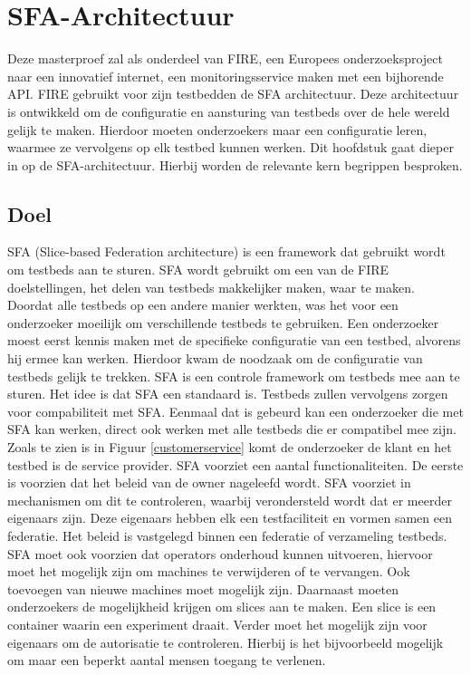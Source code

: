 \chapter{SFA-Architectuur}

{\samenvatting Deze masterproef zal als onderdeel van FIRE, een Europees onderzoeksproject naar een innovatief internet, een monitoringsservice maken met een bijhorende API. FIRE gebruikt voor zijn testbedden de SFA architectuur. Deze architectuur is ontwikkeld om de configuratie en aansturing van testbeds over de hele wereld gelijk te maken. Hierdoor moeten onderzoekers maar een configuratie leren, waarmee ze vervolgens op elk testbed kunnen werken. Dit hoofdstuk gaat dieper in op de SFA-architectuur. Hierbij worden de relevante kern begrippen besproken.}

\section{Doel}
\npar
SFA (Slice-based Federation architecture) is een framework dat gebruikt wordt om testbeds aan te sturen\citep{SFA-overview}. SFA wordt gebruikt om een van de FIRE doelstellingen, het delen van testbeds makkelijker maken, waar te maken. Doordat alle testbeds op een andere manier werkten, was het voor een onderzoeker moeilijk om verschillende testbeds te gebruiken. Een onderzoeker moest eerst kennis maken met de specifieke configuratie van een testbed, alvorens hij ermee kan werken. Hierdoor kwam de noodzaak om de configuratie van testbeds gelijk te trekken.
\clearpage
\npar
SFA is een controle framework om testbeds mee aan te sturen. Het idee is dat SFA een standaard is. Testbeds zullen vervolgens zorgen voor compabiliteit met SFA. Eenmaal dat is gebeurd kan een onderzoeker die met SFA kan werken, direct ook werken met alle testbeds die er compatibel mee zijn. Zoals te zien is in Figuur \ref{customerservice} komt de onderzoeker de klant en het testbed is de service provider.
\npar
SFA voorziet een aantal functionaliteiten. De eerste is voorzien dat het beleid van de owner nageleefd wordt. SFA voorziet in mechanismen om dit te controleren, waarbij verondersteld wordt dat er meerder eigenaars zijn. Deze eigenaars hebben elk een testfaciliteit en vormen samen een federatie. Het beleid is vastgelegd binnen een federatie of verzameling testbeds.
\npar
SFA moet ook voorzien dat operators onderhoud kunnen uitvoeren, hiervoor moet het mogelijk zijn om machines te verwijderen of te vervangen. Ook toevoegen van nieuwe machines moet mogelijk zijn. Daarnaast moeten onderzoekers de mogelijkheid krijgen om slices aan te maken. Een slice is een container waarin een experiment draait. Verder moet het mogelijk zijn voor eigenaars om de autorisatie te controleren. Hierbij is het bijvoorbeeld mogelijk om maar een beperkt aantal mensen toegang te verlenen.
\clearpage
